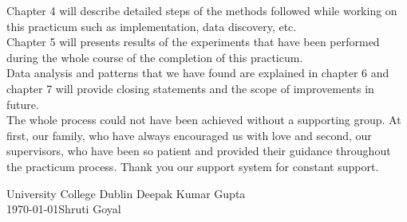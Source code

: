 Chapter 4 will describe detailed steps of the methods followed while working on this practicum such as implementation, data discovery, etc.\\

Chapter 5 will presents results of the experiments that have been performed during the whole course of the completion of this practicum.\\

Data analysis and patterns that we have found are explained in chapter 6 and chapter 7 will provide closing statements and the scope of improvements in future.\\

The whole process could not have been achieved without a supporting group. At first, our family, who have always encouraged us with love and second, our supervisors, who have been so patient and provided their guidance throughout the practicum process. Thank you our support system for constant support.

\vspace{2em}

University College Dublin \hfill Deepak Kumar Gupta \\
\today \hfill Shruti Goyal
